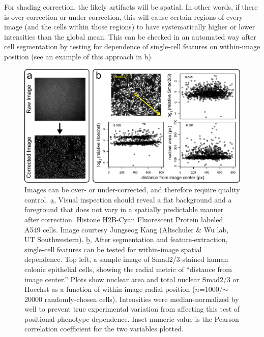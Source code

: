 For shading correction, the likely artifacts will be
spatial. In other words, if there is over-correction
or under-correction,
this will cause certain regions of every image (and
the cells within those regions) to have systematically
higher or lower intensities than the global mean. This can be checked
in an automated way after cell segmentation by testing
for dependence of single-cell features on within-image
position (see an example of this approach in
b).



 \begin{figure}[!bt]
  \centering
  \includegraphics[width=6in]{FIGS/imaging/flatfieldCheck.pdf}
  {\singlespacing 
  \caption[ Quality control for image correction.]
            {Images can be over- or under-corrected, and
            therefore require quality control. \b{a},
            Visual inspection should reveal a flat background
            and a foreground that does not vary in a
            spatially predictable manner after correction. Histone H2B-Cyan
            Fluorescent Protein labeled A549 cells. Image
            courtesy Jungseog Kang (Altschuler \& Wu lab,
            UT Southwestern). \b{b},
            After segmentation and feature-extraction,
            single-cell features can be tested for within-image
            spatial dependence. Top left, a sample image of
            Smad2/3-stained human colonic epithelial cells,
            showing the radial metric of ``distance from image
            center.'' Plots show nuclear area and
            total nuclear Smad2/3 or Hoechst
            as a function of within-image radial position
            ($n$=1000/$\sim$20000 randomly-chosen cells).
            Intensities were median-normalized by well to prevent
            true experimental variation from affecting this
            test of positional phenotype dependence.
            Inset
            numeric value is the Pearson correlation coefficient
            for the two variables plotted. }
  \label{fig:imaging:flatfieldCheck}}
  \end{figure}